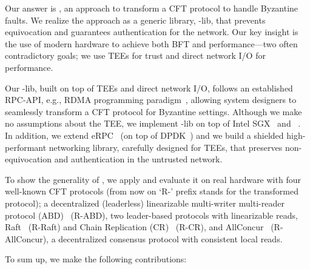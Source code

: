 Our answer is \projecttitle{}, an approach to transform a CFT protocol to handle Byzantine faults. We realize the \projecttitle{} approach as a generic library, \projecttitle{}-lib, that prevents equivocation and guarantees authentication for the network. Our key insight is the use of modern hardware to achieve both BFT and performance---two often contradictory goals; we use TEEs for trust and direct network I/O for performance.


Our \projecttitle{}-lib, built on top of TEEs and direct network I/O, follows an established RPC-API, e.g., RDMA programming paradigm~\cite{rdma}, allowing system designers to seamlessly transform a CFT protocol for Byzantine settings. Although we make no assumptions about the TEE, we implement \projecttitle{}-lib on top of Intel SGX~\cite{intel-sgx} and \scone{}~\cite{arnautov2016scone}. In addition, we extend eRPC~\cite{erpc} (on top of DPDK~\cite{dpdk}) and we build a shielded high-performant networking library, carefully designed for TEEs, that preserves non-equivocation and authentication in the untrusted network.


To show the generality of \projecttitle{}, we apply and evaluate it on real hardware with four well-known CFT protocols (from now on `R-' prefix stands for the transformed protocol); a decentralized (leaderless) linearizable multi-writer multi-reader protocol (ABD)~\cite{lynch:1997} (R-ABD), two leader-based protocols with linearizable reads, Raft~\cite{raft} (R-Raft) and Chain Replication (CR)~\cite{chain-replication} (R-CR), and AllConcur~\cite{Poke2016AllConcurLC} (R-AllConcur), a decentralized consensus protocol with consistent local reads. %

To sum up, we make the following contributions:


